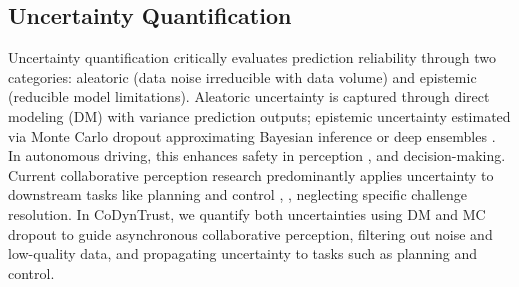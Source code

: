 \subsection{Uncertainty Quantiﬁcation}

Uncertainty quantification critically evaluates prediction reliability through two categories: aleatoric (data noise irreducible with data volume) and epistemic (reducible model limitations). Aleatoric uncertainty is captured through direct modeling (DM) \cite{unc:dm} with variance prediction outputs; epistemic uncertainty estimated via Monte Carlo dropout \cite{unc:mcdropout} approximating Bayesian inference or deep ensembles \cite{unc:deepensemble}. In autonomous driving, this enhances safety in perception \cite{unc:UMoE}, \cite{unc:multi-modal_DiFeng} and decision-making. Current collaborative perception research predominantly applies uncertainty to downstream tasks like planning and control \cite{unc:doubleM}, \cite{cp:mot-cup}, neglecting specific challenge resolution. In CoDynTrust, we quantify both uncertainties using DM and MC dropout to guide asynchronous collaborative perception, filtering out noise and low-quality data, and propagating uncertainty to tasks such as planning and control.

